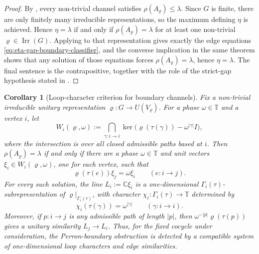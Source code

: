 \documentclass[11pt,a4paper]{amsart}
\theoremstyle{plain}
\newtheorem{corollary}[theorem]{Corollary}
\theoremstyle{definition}
\theoremstyle{remark}
\DeclareMathOperator{\Irr}{Irr}
\newcommand{\CC}{\mathbb{C}}
\newcommand{\TT}{\mathbb{T}}
\begin{document}
\begin{proof}
  By , every non-trivial channel
  satisfies \(\rho(A_\varrho)\le\lambda\). Since \(G\) is finite, there
  are only finitely many irreducible representations, so the maximum
  defining \(\eta\) is achieved. Hence \(\eta=\lambda\) if and only if
  \(\rho(A_\varrho)=\lambda\) for at least one non-trivial
  \(\varrho\in\Irr(G)\). Applying  to that
  representation gives exactly the edge equations
  \eqref{eq:eta-gap-boundary-classifier}, and the converse implication in
  the same theorem shows that any solution of those equations forces
  \(\rho(A_\varrho)=\lambda\), hence \(\eta=\lambda\). The final sentence
  is the contrapositive, together with the role of the strict-gap
  hypothesis stated in .
\end{proof}

\begin{corollary}[Loop-character criterion for boundary channels]
  \label{cor:eta-gap-character-classification}
  Fix a non-trivial irreducible unitary representation
  \(\varrho:G\to U(V_\varrho)\). For a phase \(\omega\in\TT\) and a vertex
  \(i\), let
  \[
    W_i(\varrho,\omega)
    :=
    \bigcap_{\gamma:i\to i}
    \ker\bigl(\varrho(\tau(\gamma))-\omega^{|\gamma|}I\bigr),
  \]
  where the intersection is over all closed admissible paths based at
  \(i\). Then \(\rho(A_\varrho)=\lambda\) if and only if there are a phase
  \(\omega\in\TT\) and unit vectors
  \(\xi_i\in W_i(\varrho,\omega)\), one for each vertex, such that
  \[
    \varrho(\tau(e))\xi_j=\omega\xi_i
    \qquad(e:i\to j).
  \]
  For every such solution, the line
  \(L_i:=\CC\xi_i\) is a one-dimensional
  \(\Gamma_i(\tau)\)-subrepresentation of
  \(\varrho|_{\Gamma_i(\tau)}\), with character
  \(\chi_i:\Gamma_i(\tau)\to\TT\) determined by
  \[
    \chi_i(\tau(\gamma))=\omega^{|\gamma|}
    \qquad(\gamma:i\to i).
  \]
  Moreover, if \(p:i\to j\) is any admissible path of length \(|p|\), then
  \(\omega^{-|p|}\varrho(\tau(p))\) gives a unitary similarity
  \(L_j\to L_i\). Thus, for the fixed cocycle under consideration, the
  Perron-boundary obstruction is detected by a compatible system of
  one-dimensional loop characters and edge similarities.
\end{corollary}
\end{document}
